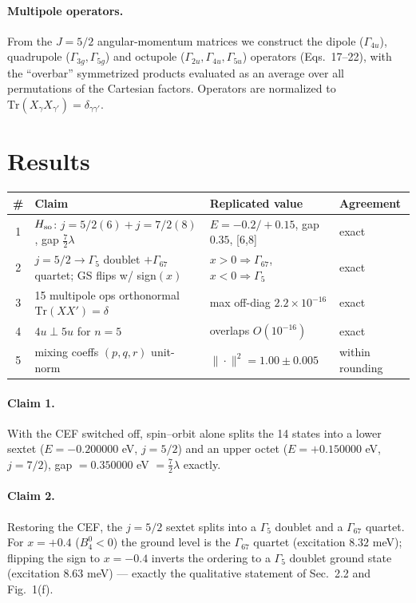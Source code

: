 \documentclass[11pt]{article}
\begin{document}
\paragraph{Multipole operators.} From the $J=5/2$ angular-momentum matrices we
construct the dipole ($\Gamma_{4u}$), quadrupole ($\Gamma_{3g},\Gamma_{5g}$)
and octupole ($\Gamma_{2u},\Gamma_{4u},\Gamma_{5u}$) operators (Eqs.~17--22),
with the ``overbar'' symmetrized products evaluated as an average over all
permutations of the Cartesian factors. Operators are normalized to
$\mathrm{Tr}(X_\gamma X_{\gamma'})=\delta_{\gamma\gamma'}$.

\section{Results}
\begin{table}[h]
\centering
\begin{tabular}{clll}
\toprule
\# & Claim & Replicated value & Agreement \\
\midrule
1 & $H_{\rm so}$: $j{=}5/2(6)+j{=}7/2(8)$, gap $\tfrac72\lambda$
  & $E=-0.2/{+}0.15$, gap $0.35$, [6,8] & exact \\
2 & $j{=}5/2\!\to\!\Gamma_5$ doublet $+\Gamma_{67}$ quartet; GS flips w/ sign$(x)$
  & $x{>}0\!\Rightarrow\!\Gamma_{67}$, $x{<}0\!\Rightarrow\!\Gamma_5$ & exact \\
3 & 15 multipole ops orthonormal $\mathrm{Tr}(XX'){=}\delta$
  & max off-diag $2.2{\times}10^{-16}$ & exact \\
4 & $4u\perp5u$ for $n{=}5$
  & overlaps $O(10^{-16})$ & exact \\
5 & mixing coeffs $(p,q,r)$ unit-norm
  & $\|\cdot\|^2 = 1.00\pm0.005$ & within rounding \\
\bottomrule
\end{tabular}
\end{table}

\paragraph{Claim 1.} With the CEF switched off, spin--orbit alone splits the 14
states into a lower sextet ($E=-0.200000$ eV, $j=5/2$) and an upper octet
($E=+0.150000$ eV, $j=7/2$), gap $=0.350000$ eV $=\tfrac72\lambda$ exactly.

\paragraph{Claim 2.} Restoring the CEF, the $j=5/2$ sextet splits into a
$\Gamma_5$ doublet and a $\Gamma_{67}$ quartet. For $x=+0.4$ ($B_4^0<0$) the
ground level is the $\Gamma_{67}$ quartet (excitation $8.32$ meV); flipping the
sign to $x=-0.4$ inverts the ordering to a $\Gamma_5$ doublet ground state
(excitation $8.63$ meV) --- exactly the qualitative statement of Sec.~2.2 and
Fig.~1(f).
\end{document}
